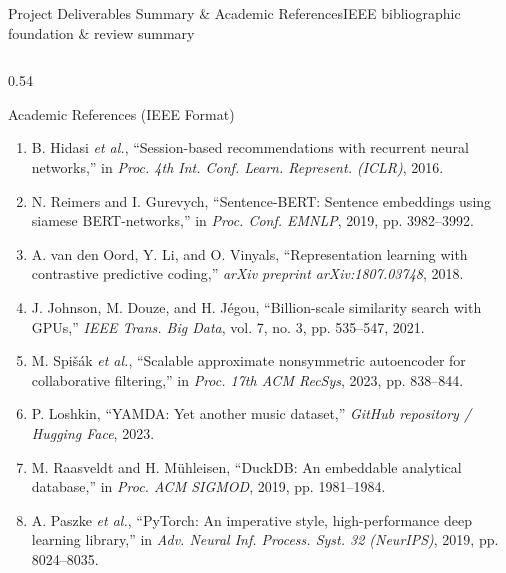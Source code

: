 \documentclass[aspectratio=169,10pt]{beamer}
\begin{document}
\begin{frame}{Project Deliverables Summary \& Academic References}{IEEE bibliographic foundation \& review summary}
\begin{columns}[T]
        \begin{column}{0.54\textwidth}
            \begin{block}{Academic References (IEEE Format)}
                \fontsize{4.4pt}{5.4pt}\selectfont
                \begin{enumerate}\setlength{\itemsep}{1.2pt}\setlength{\parskip}{0pt}\leftmargin=6pt
                    \item[{[1]}] B. Hidasi \textit{et al.}, ``Session-based recommendations with recurrent neural networks,'' in \textit{Proc. 4th Int. Conf. Learn. Represent. (ICLR)}, 2016. \href{https://arxiv.org/abs/1511.06939}{\color{focusBlue}{[arXiv:1511.06939]}}
                    \item[{[2]}] N. Reimers and I. Gurevych, ``Sentence-BERT: Sentence embeddings using siamese BERT-networks,'' in \textit{Proc. Conf. EMNLP}, 2019, pp. 3982--3992. \href{https://arxiv.org/abs/1908.10084}{\color{focusBlue}{[arXiv:1908.10084]}}
                    \item[{[3]}] A. van den Oord, Y. Li, and O. Vinyals, ``Representation learning with contrastive predictive coding,'' \textit{arXiv preprint arXiv:1807.03748}, 2018. \href{https://arxiv.org/abs/1807.03748}{\color{focusBlue}{[arXiv:1807.03748]}}
                    \item[{[4]}] J. Johnson, M. Douze, and H. J{\'e}gou, ``Billion-scale similarity search with GPUs,'' \textit{IEEE Trans. Big Data}, vol. 7, no. 3, pp. 535--547, 2021. \href{https://arxiv.org/abs/1702.08734}{\color{focusBlue}{[IEEE/arXiv:1702.08734]}}
                    \item[{[5]}] M. Spi{\v{s}}{\'a}k \textit{et al.}, ``Scalable approximate nonsymmetric autoencoder for collaborative filtering,'' in \textit{Proc. 17th ACM RecSys}, 2023, pp. 838--844. \href{https://arxiv.org/abs/2308.06733}{\color{focusBlue}{[RecSys/arXiv:2308.06733]}}
                    \item[{[6]}] P. Loshkin, ``YAMDA: Yet another music dataset,'' \textit{GitHub repository / Hugging Face}, 2023. \href{https://github.com/ploshkin}{\color{focusBlue}{[Online Dataset]}}
                    \item[{[7]}] M. Raasveldt and H. M{\"u}hleisen, ``DuckDB: An embeddable analytical database,'' in \textit{Proc. ACM SIGMOD}, 2019, pp. 1981--1984. \href{https://doi.org/10.1145/3299869.3320212}{\color{focusBlue}{[ACM SIGMOD]}}
                    \item[{[8]}] A. Paszke \textit{et al.}, ``PyTorch: An imperative style, high-performance deep learning library,'' in \textit{Adv. Neural Inf. Process. Syst. 32 (NeurIPS)}, 2019, pp. 8024--8035. \href{https://arxiv.org/abs/1912.01703}{\color{focusBlue}{[NeurIPS/arXiv]}}
                \end{enumerate}
            \end{block}


\end{column}
\end{columns}
\end{frame}
\end{document}
